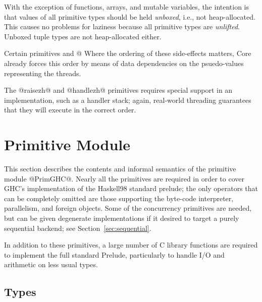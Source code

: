 \documentclass[10pt]{article}
\begin{document}
With the exception of functions, arrays, and mutable variables, the intention is that values of all primitive types
should be held {\it unboxed}, i.e., not heap-allocated.  This causes no problems for laziness because all
primitive types are {\it unlifted}.  Unboxed tuple types are not heap-allocated either.

Certain primitives and @%
Where the ordering of these side-effects matters, Core already forces this order
by means of data dependencies on the psuedo-values representing the threads.

The @raisezh@ and @handlezh@ primitives requires special support in an implementation, such as a handler stack; 
again, real-world threading guarantees that they will execute in the correct order.

\section{Primitive Module}
\label{sec:prims}

This section describes the contents and informal semantics of the primitive module @PrimGHC@.
Nearly all the primitives are required in order to cover GHC's implementation of the Haskell98
standard prelude; the only operators that can be completely omitted are those supporting the byte-code interpreter, 
parallelism, and foreign objects.  Some of the concurrency primitives are needed, but can be
given degenerate implementations if it desired to target a purely sequential backend; see Section~\ref{sec:sequential}.

In addition to these primitives, a large number of C library functions are required to implement
the full standard Prelude, particularly to handle I/O and arithmetic on less usual types.

\subsection{Types}
\end{document}

